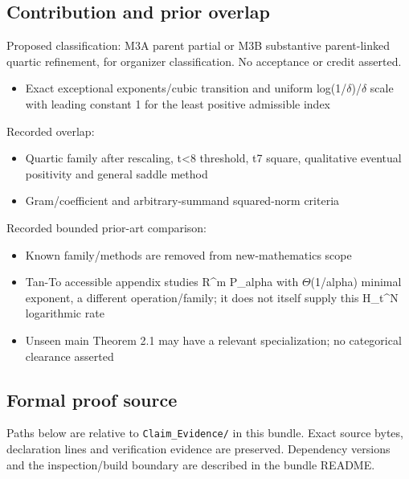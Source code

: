 \documentclass[11pt,a4paper]{article}
\begin{document}
\subsection{Contribution and prior overlap}
Proposed classification: M3A parent partial or M3B substantive parent-linked quartic refinement, for organizer classification. No acceptance or credit asserted.

\begin{itemize}
\item Exact exceptional exponents/cubic transition and uniform log(1/\ensuremath{\delta})/\ensuremath{\delta} scale with leading constant 1 for the least positive admissible index
\end{itemize}
Recorded overlap:

\begin{itemize}
\item Quartic family after rescaling, t<8 threshold, t7 square, qualitative eventual positivity and general saddle method
\end{itemize}
\begin{itemize}
\item Gram/coefficient and arbitrary-summand squared-norm criteria
\end{itemize}
Recorded bounded prior-art comparison:

\begin{itemize}
\item Known family/methods are removed from new-mathematics scope
\end{itemize}
\begin{itemize}
\item Tan-To accessible appendix studies R\textasciicircum{}m P\_alpha with \ensuremath{\Theta}(1/alpha) minimal exponent, a different operation/family; it does not itself supply this H\_t\textasciicircum{}N logarithmic rate
\end{itemize}
\begin{itemize}
\item Unseen main Theorem 2.1 may have a relevant specialization; no categorical clearance asserted
\end{itemize}
\subsection{Formal proof source}
Paths below are relative to \texttt{Claim\_Evidence/} in this bundle. Exact source bytes, declaration lines and verification evidence are preserved. Dependency versions and the inspection/build boundary are described in the bundle README.
\end{document}

